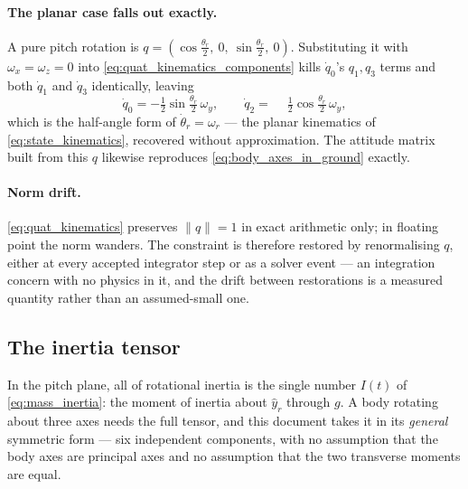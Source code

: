 \paragraph{The planar case falls out exactly.} A pure pitch rotation is
$q = \left(\cos\tfrac{\theta_r}{2},\ 0,\ \sin\tfrac{\theta_r}{2},\ 0\right)$. Substituting it with
$\omega_x=\omega_z=0$ into \autoref{eq:quat_kinematics_components} kills $\dot q_0$'s $q_1,q_3$
terms and both $\dot q_1$ and $\dot q_3$ identically, leaving
\begin{equation} \label{eq:quat_pitch_only}
    \dot q_0 = -\tfrac12\sin\tfrac{\theta_r}{2}\,\omega_y, \qquad
    \dot q_2 = \phantom{-}\tfrac12\cos\tfrac{\theta_r}{2}\,\omega_y,
\end{equation}
which is the half-angle form of $\dot\theta_r = \omega_r$ --- the planar kinematics of
\autoref{eq:state_kinematics}, recovered without approximation. The attitude matrix built from this
$q$ likewise reproduces \autoref{eq:body_axes_in_ground} exactly.

\paragraph{Norm drift.} \autoref{eq:quat_kinematics} preserves $\lVert q\rVert = 1$ in exact
arithmetic only; in floating point the norm wanders. The constraint is therefore restored by
renormalising $q$, either at every accepted integrator step or as a solver event ---
an integration concern with no physics in it, and the drift between restorations is a measured
quantity rather than an assumed-small one.

\subsection{The inertia tensor}\label{sec:3d_inertia}
In the pitch plane, all of rotational inertia is the single number $I(t)$ of
\autoref{eq:mass_inertia}: the moment of inertia about $\hat{y}_r$ through $g$. A body rotating
about three axes needs the full tensor, and this document takes it in its \emph{general} symmetric
form --- six independent components, with no assumption that the body axes are principal axes and
no assumption that the two transverse moments are equal.

